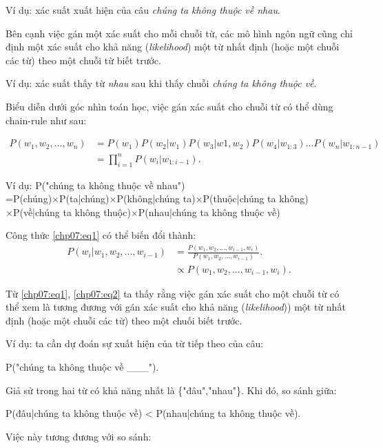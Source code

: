 Ví dụ: xác suất xuất hiện của câu \textit{chúng ta không thuộc về nhau}.

Bên cạnh việc gán một xác suất cho mỗi chuỗi từ, các mô hình ngôn ngữ cũng chỉ định một xác suất cho khả năng (\textit{likelihood}) một từ nhất định (hoặc một chuỗi các từ) theo một chuỗi từ biết trước.

Ví dụ: xác suất thấy từ \textit{nhau} sau khi thấy chuỗi \textit{chúng ta không thuộc về}.

Biểu diễn dưới góc nhìn toán học, việc gán xác suất cho chuỗi từ có thể dùng chain-rule như sau:

\begin{equation}
\label{chp07:eq1}
\begin{split}
P(w_1,w_2,...,w_n)&= P(w_1)P(w_2|w_1)P(w_3|w1,w_2)P(w_4|w_{1:3})...P(w_n|w_{1:n-1})\\
&=\displaystyle\prod_{i=1}^{n} P(w_i|w_{1:i-1}).
\end{split}
\end{equation}

Ví dụ: P("chúng ta không thuộc về nhau")\\
       =P(chúng)$\times$P(ta|chúng)$\times$P(không|chúng ta)$\times$P(thuộc|chúng ta không)\\
       $\times$P(về|chúng ta không thuộc)$\times$P(nhau|chúng ta không thuộc về)

Công thức \ref{chp07:eq1} có thể biến đổi thành:
\begin{equation}
\label{chp07:eq2}
\begin{split}
P(w_i|w_1,w_2,...,w_{i-1})&=\frac{P(w_1,w_2,...,w_{i-1},w_i)}{P(w_1,w_2,...,w_{i-1})}.\\
&\propto P(w_1,w_2,...,w_{i-1},w_i).
\end{split}
\end{equation}

Từ \eqref{chp07:eq1}, \eqref{chp07:eq2} ta thấy rằng việc gán xác suất cho một chuỗi từ có thể xem là tương đương với gán xác suất cho khả năng (\textit{likelihood})) một từ nhất định  (hoặc một chuỗi các từ) theo một chuối biết trước.

Ví dụ: ta cần dự đoán sự xuất hiện của từ tiếp theo của câu:

P("chúng ta không thuộc về \_\_\_"). 

Giả sử trong hai từ có khả năng nhất là \{"đâu","nhau"\}. Khi đó, so sánh giữa:

P(đâu|chúng ta không thuộc về) < P(nhau|chúng ta không thuộc về). 

Việc này tương đương với so sánh:

